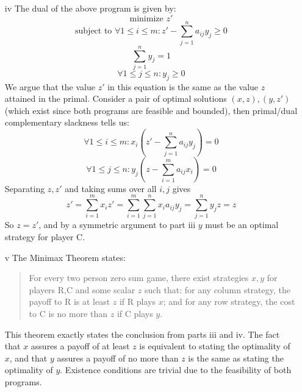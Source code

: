 \documentclass{article}
\begin{document}
\begin{itemize}
\item[iv] The dual of the above program is given by:
\[ \textrm{minimize } z' \]
\[ \textrm{subject to } \forall 1 \leq i \leq m : z' - \sum  \limits_{j=1}^n a_{ij} y_j \geq 0 \]
\[ \sum \limits_{j=1}^n y_j = 1 \]
\[ \forall 1 \leq j \leq n : y_j \geq 0 \]
We argue that the value $z'$ in this equation is the same as the value $z$ attained in the primal.  Consider a pair of optimal solutions $(x,z), (y,z')$ (which exist since both programs are feasible and bounded), then primal/dual complementary slackness tells us:
\[ \forall 1 \leq i \leq m : x_i(z' - \sum \limits_{j=1}^n a_{ij} y_j) = 0 \]
\[ \forall 1 \leq j \leq n : y_j(z - \sum \limits_{i=1}^m a_{ij} x_i) = 0 \]
Separating $z,z'$ and taking sums over all $i,j$ gives
\[ z' = \sum \limits_{i=1}^m x_i z' = \sum \limits_{i=1}^m  \sum \limits_{j=1}^n x_i a_{ij} y_j = \sum \limits_{j=1}^n y_j z = z \]
So $z = z'$, and by a symmetric argument to part iii $y$ must be an optimal strategy for player C.

\item[v] The Minimax Theorem states:
\begin{quote}
For every two person zero sum game, there exist strategies $x,y$ for players R,C and some scalar $z$ such that: for any column strategy, the payoff to R is at least $z$ if R plays $x$; and for any row strategy, the cost to C is no more than $z$ if C plays $y$.
\end{quote}

This theorem exactly states the conclusion from parts iii and iv.  The fact that $x$ assures a payoff of at least $z$ is equivalent to stating the optimality of $x$, and that $y$ assures a payoff of no more than $z$ is the same as stating the optimality of $y$.  Existence conditions are trivial due to the feasibility of both programs.

\end{itemize}
\end{document}
